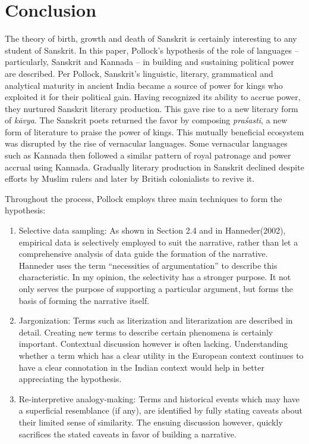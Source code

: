 \section{Conclusion}

The theory of birth, growth and death of Sanskrit is certainly interesting to any student of Sanskrit. In this paper, Pollock’s hypothesis of the role of languages – particularly, Sanskrit and Kannada – in building and sustaining political power are described. Per Pollock, Sanskrit’s linguistic, literary, grammatical and analytical maturity in ancient India became a source of power for kings who exploited it for their political gain. Having recognized its ability to accrue power, they nurtured Sanskrit literary production. This gave rise to a new literary form of {\sl kāvya}. The Sanskrit poets returned the favor by composing {\sl praśasti}, a new form of literature to praise the power of kings. This mutually beneficial ecosystem was disrupted by the rise of vernacular languages. Some vernacular languages such as Kannada then followed a similar pattern of royal patronage and power accrual using Kannada. Gradually literary production in Sanskrit declined despite efforts by Muslim rulers and later by British colonialists to revive it. 

Throughout the process, Pollock employs three main techniques to form the hypothesis: 
\begin{enumerate}
\itemsep=0pt
\item Selective data sampling: As shown in Section 2.4 and in Hanneder(2002), empirical data is selectively employed to suit the narrative, rather than let a comprehensive analysis of data guide the formation of the narrative. Hanneder uses the term “necessities of argumentation” to describe this characteristic. In my opinion, the selectivity has a stronger purpose. It not only serves the purpose of supporting a particular argument, but forms the basis of forming the narrative itself.  
\item Jargonization: Terms such as literization and literarization are described in detail.  Creating new terms to describe certain phenomena is certainly important. Contextual discussion however is often lacking. Understanding whether a term which has a clear utility in the European context continues to have a clear connotation in the Indian context would help in better appreciating the hypothesis.
\item Re-interpretive analogy-making: Terms and historical events which may have a superficial resemblance (if any), are identified by fully stating caveats about their limited sense of similarity. The ensuing discussion however, quickly sacrifices the stated caveats in favor of building a narrative.
\end{enumerate}

